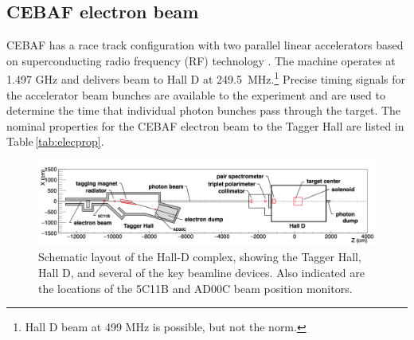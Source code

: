 \subsection{CEBAF electron beam \label{sec:ebeam}}
CEBAF has a race track configuration with two parallel linear accelerators based on superconducting radio frequency (RF) technology \cite{Leemann:2001dg}. The machine operates at 1.497 GHz and delivers beam to Hall D at 249.5~MHz.\footnote{Hall D beam at 499 MHz is possible, but not the norm.} Precise timing signals for the accelerator beam bunches are available to the experiment and are used to determine the time that individual photon bunches pass through the target. The nominal properties for the CEBAF electron beam to the Tagger Hall are listed in Table\,\ref{tab:elecprop}.
\begin{figure}[t]
\begin{center}
 \includegraphics[clip=true,width=0.98\linewidth]{figures/Draw_beamline.png}
\end{center}
\caption{Schematic layout of the Hall-D complex, showing the Tagger Hall, Hall D, and
several of the key beamline devices.
Also indicated are the locations of the 5C11B and AD00C beam position monitors.
        }
\label{fig:beam:Draw_beamline} 
\end{figure}

